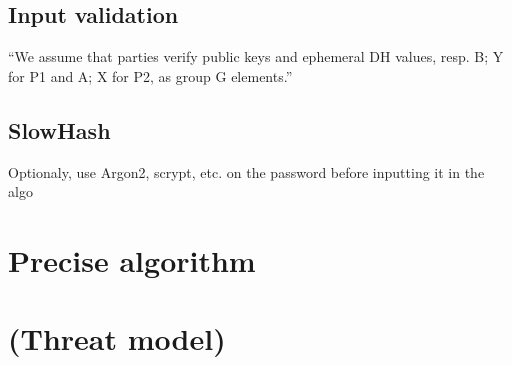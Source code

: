 \documentclass[../report.tex]{subfiles}
\begin{document}
\subsection{Input validation}
``We assume that parties verify public keys and ephemeral DH values, resp.
B; Y for P1 and A; X for P2, as group G elements.''

\subsection{SlowHash}
Optionaly, use Argon2, scrypt, etc. on the password before inputting it in the algo


\section{Precise algorithm}

\section{(Threat model)}
\end{document}
